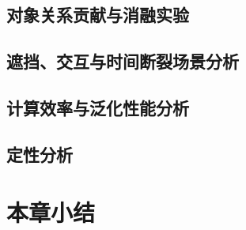 \subsection{对象关系贡献与消融实验}

\subsection{遮挡、交互与时间断裂场景分析}

\subsection{计算效率与泛化性能分析}

\subsection{定性分析}

\section{本章小结}
